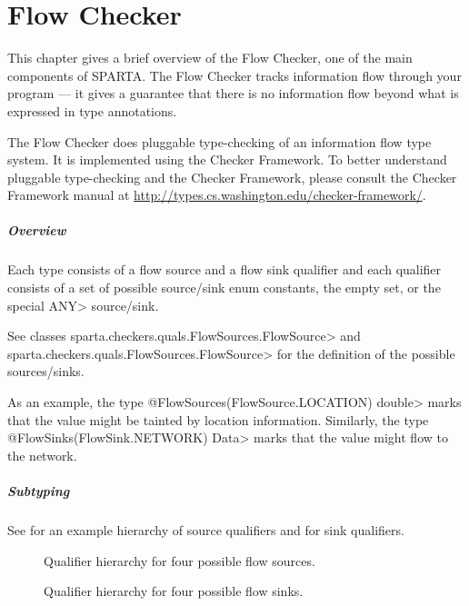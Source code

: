 \htmlhr
\chapter{Flow Checker\label{flow-checker}}

This chapter gives a brief overview of the Flow Checker, one of
the main components of SPARTA\@.  The Flow Checker tracks information flow
through your program --- it gives a guarantee that there is no information
flow beyond what is expressed in type annotations.

The Flow Checker does pluggable type-checking of an information flow type
system.  It is implemented using the Checker Framework.  To better
understand pluggable type-checking and the Checker Framework, please
consult the Checker Framework manual at
\url{http://types.cs.washington.edu/checker-framework/}.  

\paragraph{Overview}

Each type consists of a flow source and a flow sink qualifier and each
qualifier consists of a set of possible source/sink enum constants,
the empty set, or the special \<ANY> source/sink.

See classes
\<sparta.checkers.quals.FlowSources.FlowSource> and\\
\<sparta.checkers.quals.FlowSources.FlowSource> for the definition of
the possible sources/sinks.

As an example, the type
\<@FlowSources(FlowSource.LOCATION) double>
marks that the value might be tainted by location information.
Similarly, the type
\<@FlowSinks(FlowSink.NETWORK) Data>
marks that the value might flow to the network.


\paragraph{Subtyping}

See  for an example hierarchy of
source qualifiers and  for sink
qualifiers.


\begin{figure}
\caption{Qualifier hierarchy for four possible flow sources.}
\label{fig:flowsources-hierarchy}
\end{figure}

\begin{figure}
\caption{Qualifier hierarchy for four possible flow sinks.}
\label{fig:flowsinks-hierarchy}
\end{figure}

